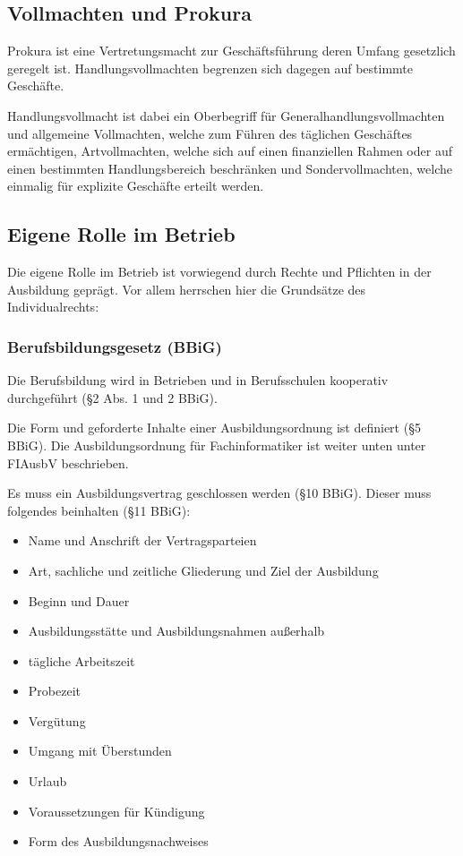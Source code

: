 \subsection{Vollmachten und Prokura}

Prokura ist eine Vertretungsmacht zur Geschäftsführung deren Umfang gesetzlich geregelt ist. Handlungsvollmachten begrenzen sich dagegen auf bestimmte Geschäfte.

Handlungsvollmacht ist dabei ein Oberbegriff für Generalhandlungsvollmachten und allgemeine Vollmachten, welche zum Führen des täglichen Geschäftes ermächtigen, Artvollmachten, welche sich auf einen finanziellen Rahmen oder auf einen bestimmten Handlungsbereich beschränken und Sondervollmachten, welche einmalig für explizite Geschäfte erteilt werden.

\subsection{Eigene Rolle im Betrieb}

Die eigene Rolle im Betrieb ist vorwiegend durch Rechte und Pflichten in der Ausbildung geprägt. Vor allem herrschen hier die Grundsätze des Individualrechts:

\subsubsection{Berufsbildungsgesetz (BBiG)}

Die Berufsbildung wird in Betrieben und in Berufsschulen kooperativ durchgeführt (§2 Abs. 1 und 2 BBiG).

Die Form und geforderte Inhalte einer Ausbildungsordnung ist definiert (§5 BBiG). Die Ausbildungsordnung für Fachinformatiker ist weiter unten unter FIAusbV beschrieben.

Es muss ein Ausbildungsvertrag geschlossen werden (§10 BBiG). Dieser muss folgendes beinhalten (§11 BBiG):

\begin{itemize}
    \item Name und Anschrift der Vertragsparteien
    \item Art, sachliche und zeitliche Gliederung und Ziel der Ausbildung
    \item Beginn und Dauer
    \item Ausbildungsstätte und Ausbildungsnahmen außerhalb
    \item tägliche Arbeitszeit
    \item Probezeit
    \item Vergütung
    \item Umgang mit Überstunden
    \item Urlaub
    \item Voraussetzungen für Kündigung
    \item Form des Ausbildungsnachweises
\end{itemize}

